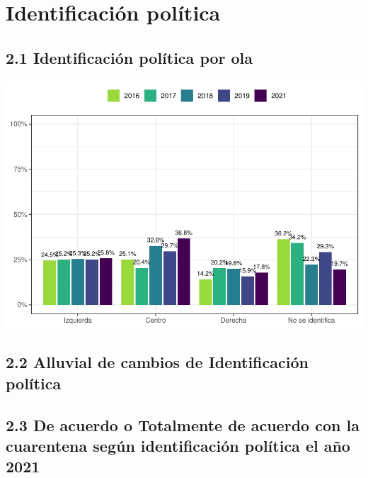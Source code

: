 \documentclass[
  12pt,
]{book}
\begin{document}
\hypertarget{identificaciuxf3n-poluxedtica-1}{%
\section{Identificación política}\label{identificaciuxf3n-poluxedtica-1}}

\hypertarget{identificaciuxf3n-poluxedtica-por-ola}{%
\subsection{2.1 Identificación política por ola}\label{identificaciuxf3n-poluxedtica-por-ola}}

\includegraphics{reporte-elsoc_files/figure-latex/unnamed-chunk-16-1.pdf}

\hypertarget{alluvial-de-cambios-de-identificaciuxf3n-poluxedtica}{%
\subsection{2.2 Alluvial de cambios de Identificación política}\label{alluvial-de-cambios-de-identificaciuxf3n-poluxedtica}}

\hypertarget{de-acuerdo-o-totalmente-de-acuerdo-con-la-cuarentena-seguxfan-identificaciuxf3n-poluxedtica-el-auxf1o-2021}{%
\subsection{2.3 De acuerdo o Totalmente de acuerdo con la cuarentena según identificación política el año 2021}\label{de-acuerdo-o-totalmente-de-acuerdo-con-la-cuarentena-seguxfan-identificaciuxf3n-poluxedtica-el-auxf1o-2021}}
\end{document}
